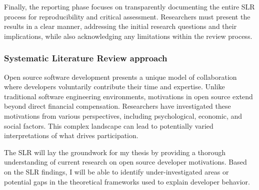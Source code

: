 Finally, the reporting phase focuses on transparently documenting the entire SLR process for reproducibility and critical assessment. Researchers must present the results in a clear manner, addressing the initial research questions and their implications, while also acknowledging any limitations within the review process.

\subsubsection{Systematic Literature Review approach}

Open source software development presents a unique model of collaboration where developers voluntarily contribute their time and expertise. Unlike traditional software engineering environments, motivations in open source extend beyond direct financial compensation. Researchers have investigated these motivations from various perspectives, including psychological, economic, and social factors. This complex landscape can lead to potentially varied interpretations of what drives participation.

The SLR will lay the groundwork for my thesis by providing a thorough understanding of current research on open source developer motivations. Based on the SLR findings, I will be able to identify under-investigated areas or potential gaps in the theoretical frameworks used to explain developer behavior.





